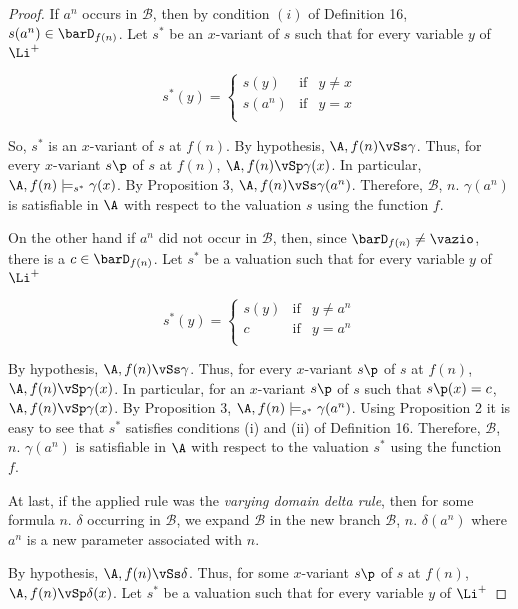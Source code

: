 \begin{proof}
\qquad If $a^{n}$ occurs in $\mathcal{B}$, then by condition $(i)$ of Definition 16, $s(a^{n}) \in \barD_{f(n)}$. Let $s^{*}$ be an $x$-variant of $s$ such that for every variable $y$ of $\Li^{+}$
  
$$
s^{*}(y) = \left\{
\begin{array}{rcl}
s(y) & \mbox{if} & y \neq x\\
s(a^{n}) & \mbox{if} & y = x\\
\end{array}
\right.
$$

\qquad So, $s^{*}$ is an $x$-variant of $s$ at $f(n)$. By hypothesis, $\A, f(n)\vSs \gamma$. Thus, for every $x$-variant $s\p$ of $s$ at $f(n)$, $\A, f(n)\vSp \gamma(x)$. In particular, $\A, f(n)\models_{s^{*}} \gamma(x)$. By Proposition 3, $\A, f(n)\vSs \gamma(a^{n})$. Therefore, $\mathcal{B}$,  $n.$ $\gamma(a^{n})$ is satisfiable in $\A$ with respect to the valuation $s$ using the function $f$.

\qquad On the other hand if $a^{n}$ did not occur in $\mathcal{B}$, then, since $\barD_{f(n)} \neq \vazio$, there is a $c \in \barD_{f(n)}$. Let $s^{*}$ be a valuation such that for every variable $y$ of $\Li^{+}$
  
$$
s^{*}(y) = \left\{
\begin{array}{rcl}
s(y) & \mbox{if} & y \neq a^{n}\\
c & \mbox{if} & y = a^{n}\\
\end{array}
\right.
$$

\qquad  By hypothesis, $\A, f(n)\vSs \gamma$. Thus, for every $x$-variant $s\p$ of $s$ at $f(n)$, $\A, f(n)\vSp \gamma(x)$. In particular, for an $x$-variant $s\p$ of $s$ such that $s\p(x)=c$, $\A, f(n)\vSp \gamma(x)$. By Proposition 3, $\A, f(n)\models_{s^{*}} \gamma(a^n)$. Using Proposition 2 it is easy to see that $s^{*}$ satisfies conditions (i) and (ii) of Definition 16. Therefore, $\mathcal{B}$,  $n.$ $\gamma(a^{n})$ is satisfiable in $\A$ with respect to the valuation $s^{*}$ using the function $f$.

\qquad  At last, if the applied rule was the \textit{varying domain delta rule}, then for some formula $n.$ $\delta$ occurring in  $\mathcal{B}$, we expand $\mathcal{B}$ in the new branch $\mathcal{B}$, $n.$ $\delta(a^{n})$ where $a^{n}$ is a new parameter associated with $n$.

\qquad By hypothesis, $\A, f(n)\vSs \delta$. Thus, for some $x$-variant $s\p$ of $s$ at $f(n)$, $\A, f(n)\vSp \delta(x)$. Let $s^{*}$ be a valuation such that for every variable $y$ of $\Li^{+}$
  

\end{proof}
